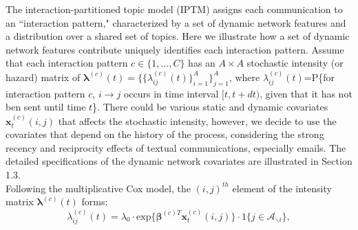 \documentclass[a4paper]{article}
\begin{document}

The interaction-partitioned topic model (IPTM) assigns each communication to an ``interaction pattern," characterized by a set of dynamic network features and a distribution over a shared set of topics. Here we illustrate how a set of dynamic network features contribute uniquely identifies each interaction pattern. Assume that each interaction pattern $c \in \{1,...,C\}$ has an $A\times A$ stochastic intensity (or hazard) matrix of $\boldsymbol{\lambda}^{(c)}(t) = \{\{\lambda^{(c)}_{ij}(t)\}_{i=1}^{A}\}_{j=1}^{A}$, where $\lambda^{(c)}_{ij}(t)$=P\{for interaction pattern $c$, $i\rightarrow j$ occurs in time interval $[t, t+dt)$, given that it has not ben sent until time $t$\}. There could be various static and dynamic covariates $\boldsymbol{x}^{(c)}_t(i, j)$ that affects the stochastic intensity, however, we decide to use the covariates
that depend on the history of the process, considering the strong recency and reciprocity effects of textual communications, especially emails. The detailed specifications of the dynamic network covariates are illustrated in Section 1.3.\\ \newline
Following the multiplicative Cox model, the $(i, j)^{th}$ element of the intensity matrix $\boldsymbol{\lambda}^{(c)}(t)$ forms:
\begin{equation}
\lambda^{(c)}_{ij}(t)=\lambda_0\cdot \mbox{exp}\Big\{\boldsymbol{\beta}^{(c)T}\boldsymbol{x}^{(c)}_t(i, j)\Big\}\cdot 1\{j \in \mathcal{A}_{\backslash i}\},
\end{equation}
\end{document}
